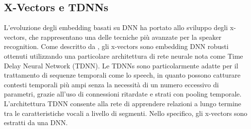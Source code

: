 \subsection{X-Vectors e TDNNs}
L'evoluzione degli embedding basati su DNN ha portato allo sviluppo degli x-vectors, che rappresentano una delle tecniche più avanzate per la 
speaker recognition. Come descritto da \cite{snyder2018x}, gli x-vectors sono embedding DNN robusti ottenuti utilizzando una particolare 
architettura di rete neurale nota come Time Delay Neural Network (TDNN).
Le TDNNs sono particolarmente adatte per il trattamento di sequenze temporali come lo speech, in quanto possono catturare contesti temporali 
più ampi senza la necessità di un numero eccessivo di parametri, grazie all'uso di connessioni ritardate e strati con pooling temporale. 
L'architettura TDNN consente alla rete di apprendere relazioni a lungo termine tra le caratteristiche vocali a livello di segmenti. 
Nello specifico, gli x-vectors sono estratti da una DNN. 

